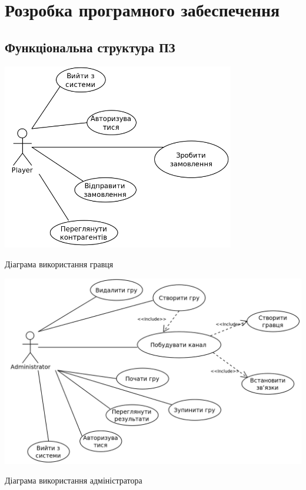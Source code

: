 \section{Розробка програмного забеспечення}
\subsection{Функціональна структура ПЗ}
\begin{stdfigure}
    \includegraphics[width=4in]{images/uml/player_use_cases.png}
    \caption{Діаграма використання гравця}
    \label{fig:uml_pl_uc}
\end{stdfigure}   

\begin{stdfigure}
    \includegraphics[width=6in]{images/uml/admin_use_cases.png}
    \caption{Діаграма використання адміністратора}
    \label{fig:uml_admin_uc}
\end{stdfigure}   


